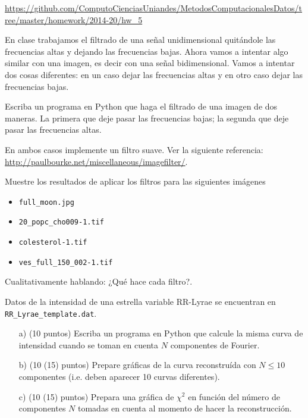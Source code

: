 \documentclass[11pt,letterpaper]{exam}
\begin{document}
\noindent
\url{https://github.com/ComputoCienciasUniandes/MetodosComputacionalesDatos/tree/master/homework/2014-20/hw_5} 
\begin{questions}





En clase trabajamos el filtrado de una se\~nal unidimensional
quit\'andole las frecuencias altas y dejando las frecuencias
bajas. Ahora vamos a intentar algo similar con una imagen, es decir con
una se\~nal bidimensional. Vamos a intentar dos cosas
diferentes: en un caso dejar las frecuencias altas y en otro caso
dejar las frecuencias bajas.

Escriba un programa en Python que haga el filtrado de una imagen de dos maneras. La primera que deje pasar las frecuencias bajas; la segunda que deje pasar las frecuencias altas. 

En ambos casos implemente un filtro suave. Ver la siguiente
referencia: \url{http://paulbourke.net/miscellaneous/imagefilter/}. 

Muestre los resultados de aplicar los filtros para las siguientes
im\'agenes 
\begin{itemize}
\item \verb"full_moon.jpg"
\item \verb"20_popc_cho009-1.tif"
\item \verb"colesterol-1.tif" 
\item \verb"ves_full_150_002-1.tif"
\end{itemize}
Cualitativamente hablando: ¿Qué hace cada filtro?. 




Datos de la intensidad de una estrella variable RR-Lyrae se encuentran
en \verb"RR_Lyrae_template.dat". 

\begin{itemize}
\item[a)] (10 puntos) Escriba un programa en Python que calcule la
  misma curva de intensidad cuando se toman en cuenta $N$
  componentes de Fourier. 
\item[b)] (10 (15) puntos) Prepare gr\'aficas de la curva
  reconstru\'ida con $N\leq 10$ componentes (i.e. deben aparecer 10
  curvas diferentes).   
\item[c)] (10 (15) puntos)
Prepara una gr\'afica de $\chi^2$ en funci\'on del n\'umero de
componentes $N$ tomadas en cuenta al momento de hacer la
reconstrucci\'on.   
\end{itemize}



\end{questions}
\end{document}
